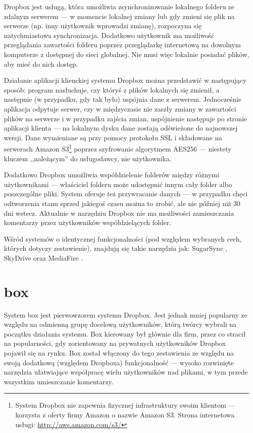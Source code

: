Dropbox jest usługą, która umożliwia zsynchronizowanie lokalnego folderu ze zdalnym serwerem --- w momencie lokalnej zmiany lub gdy zmieni się plik na serwerze (np. inny użytkownik wprowadzi zmianę), rozpoczyna się natychmiastowa synchronizacja. Dodatkowo użytkownik ma możliwość przeglądania zawartości folderu poprzez przeglądarkę internetową na dowolnym komputerze z dostępnej do sieci globalnej. Nie musi więc lokalnie posiadać plików, aby mieć do nich dostęp.

Działanie aplikacji klienckiej systemu Dropbox można przedstawić w następujący sposób: program nasłuchuje, czy któryś z plików lokalnych się zmienił, a następnie (w przypadku, gdy tak było) uspójnia dane z serwerem. Jednocześnie aplikacja odpytuje serwer, czy w międzyczasie nie zaszły zmiany w zawartości plików na serwerze i w przypadku zajścia zmian, uspójnienie następuje po stronie aplikacji klienta --- na lokalnym dysku dane zostają odświeżone do najnowszej wersji. Dane wymieniane są przy pomocy protokołu SSL i składowane na serwerach Amazon S3\footnote{System Dropbox nie zapewnia fizycznej infrastruktury swoim klientom --- korzysta z oferty firmy Amazon o nazwie Amazon S3. Strona internetowa usługi: \url{http://aws.amazon.com/s3/}} poprzez szyfrowanie algorytmem AES256 \cite{aes} --- niestety kluczem ,,należącym'' do usługodawcy, nie użytkownika.

Dodatkowo Dropbox umożliwia współdzielenie folderów między różnymi użytkownikami --- właściciel folderu może udostępnić innym cały folder albo poszczególne pliki. System oferuje też przywracanie danych --- w przypadku chęci odtworzenia stanu sprzed jakiegoś czasu można to zrobić, ale nie później niż 30 dni wstecz. Aktualnie w narzędziu Dropbox nie ma możliwości zamieszczania komentarzy przez użytkowników współdzielących folder.

Wśród systemów o identycznej funkcjonalności (pod względem wybranych cech, których dotyczy zestawienie), znajdują się takie narzędzia jak: SugarSync \cite{sugarsync}, SkyDrive \cite{skydrive} oraz MediaFire \cite{mediafire}.

\section*{box}

System box \cite{box} jest pierwowzorem systemu Dropbox. Jest jednak mniej popularny ze względu na odmienną grupę docelową użytkowników, którą twórcy wybrali na początku działania systemu. Box kierowany był głównie dla firm, przez co stracił na popularności, gdy zorientowany na prywatnych użytkowników Dropbox pojawił się na rynku. Box został włączony do tego zestawienia ze względu na swoją dodatkową (względem Dropboxa) funkcjonalność --- wysoko rozwinięte narzędzia ułatwiające współpracę wielu użytkowników nad plikami, w tym przede wszystkim umieszczanie komentarzy.

